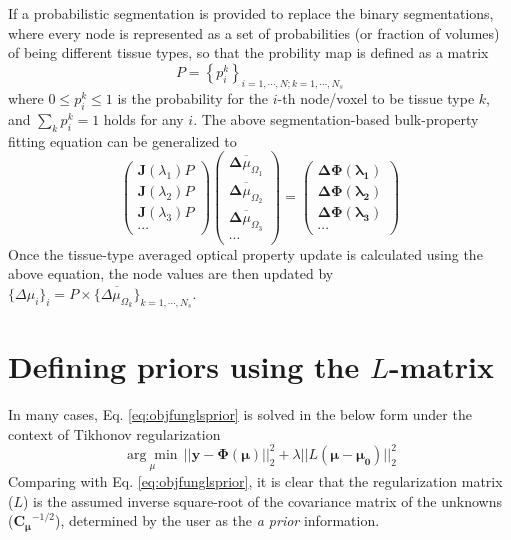 \documentclass{article}
\begin{document}
If a probabilistic segmentation is provided to replace the binary segmentations, where every node is represented as a set of probabilities (or fraction of volumes) of being different tissue types, so that the probility map is defined as a matrix
\begin{equation}
P=\left\{p^k_{i}\right\}_{i=1,\cdots,N; k=1,\cdots,N_s}
\end{equation}
where $0\le p^k_{i} \le 1$ is the probability for the $i$-th node/voxel to be tissue type $k$, and $\sum_k{p^k_{i}}=1$ holds for any $i$. The above segmentation-based bulk-property fitting equation can be generalized to
\begin{equation}\label{eq:multispectral}
\left(
\begin{array}{c}
\mathbf{J}(\lambda_1)P\\
\mathbf{J}(\lambda_2)P\\
\mathbf{J}(\lambda_3)P\\
\cdots 
\end{array}\right)
\left(
\begin{array}{c}
\overline{\boldsymbol{\Delta}{\mu_{\Omega_1}}}\\
\overline{\boldsymbol{\Delta}{\mu_{\Omega_2}}}\\
\overline{\boldsymbol{\Delta}{\mu_{\Omega_3}}}\\
\cdots
\end{array}
\right)=\left(
\begin{array}{c}
\boldsymbol{\Delta\Phi(\lambda_1)}\\
\boldsymbol{\Delta\Phi(\lambda_2)}\\
\boldsymbol{\Delta\Phi(\lambda_3)}\\
\cdots
\end{array}\right)
\end{equation}
Once the tissue-type averaged optical property update is calculated using the above equation, the node values are then updated by $\{\Delta\mu_i\}_i=P\times\{\overline{\Delta\mu_{\Omega_k}}\}_{k=1,\cdots,N_s}$.

\section{Defining priors using the $L$-matrix}\label{sec:Lmatrix}
In many cases, Eq. \ref{eq:objfunglsprior} is solved in the below form under the context of Tikhonov regularization
\begin{equation}
\underset{\mu}{\arg\min} \, || \boldsymbol{y-\Phi(\mu)} ||^2_2 + \lambda|| L(\boldsymbol{\mu-\mu_0}) ||^2_2
\end{equation}
Comparing with Eq. \ref{eq:objfunglsprior}, it is clear that the regularization matrix ($L$) is the assumed inverse square-root of the covariance matrix of the unknowns ($\mathbf{C_\mu}^{-1/2}$), determined by the user as the \emph{a prior} information.
\end{document}
